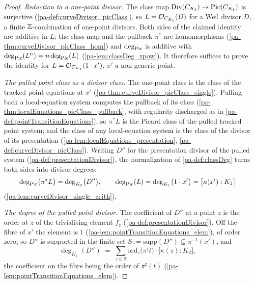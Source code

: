 \begin{proof}
  \leanok
  \emph{Reduction to a one-point divisor.} The class map
  \(\operatorname{Div}(C_{K_1}) \to \operatorname{Pic}(C_{K_1})\) is surjective (\ref{pa-def:curveDivisor_picClass}),
  so \(L = \mathcal{O}_{C_{K_1}}(D)\) for a Weil divisor \(D\), a finite \(\mathbb{Z}\)-combination of
  one-point divisors. Both sides of the claimed identity are additive in \(L\): the
  class map and the pullback \(\pi^{*}\) are homomorphisms
  (\ref{pa-thm:curveDivisor_picClass_hom}) and \(\deg_{\operatorname{Pic}}\) is additive with
  \(\deg_{\operatorname{Pic}}(L^n) = n\deg_{\operatorname{Pic}}(L)\) (\ref{pa-lem:classDeg_zpow}). It therefore
  suffices to prove the identity for \(L = \mathcal{O}_{C_{K_1}}(1 \cdot x')\), \(x'\) a
  non-generic point.

  \emph{The pulled point class as a divisor class.} The one-point class is the class
  of the tracked point equations at \(x'\)
  (\ref{pa-thm:curveDivisor_picClass_single}). Pulling back a local-equation system
  computes the pullback of its class (\ref{pa-thm:localEquations_picClass_pullback},
  with regularity discharged as in \ref{pa-def:pointTransitionEquations}), so
  \(\pi^{*}L\) is the Picard class of the pulled tracked point system; and the class
  of any local-equation system is the class of the divisor of its presentation
  (\ref{pa-lem:localEquations_presentation}, \ref{pa-def:curveDivisor_picClass}). Writing
  \(D''\) for the presentation divisor of the pulled system
  (\ref{pa-def:presentationDivisor}), the normalization of \ref{pa-def:classDeg} turns both
  sides into divisor degrees:
  \[
    \deg_{\operatorname{Pic}}\bigl(\pi^{*}L\bigr) = \deg_{K_2}\bigl(D''\bigr), \qquad
    \deg_{\operatorname{Pic}}(L) = \deg_{K_1}\bigl(1 \cdot x'\bigr) = \bigl[\kappa(x') : K_1\bigr]
  \]
  (\ref{pa-lem:curveDivisor_single_arith}).

  \emph{The degree of the pulled point divisor.} The coefficient of \(D''\) at a point
  \(z\) is the order at \(z\) of the trivialising element \(f_z\)
  (\ref{pa-def:presentationDivisor}). Off the fibre of \(x'\) the element is \(1\)
  (\ref{pa-lem:pointTransitionEquations_elem}), of order zero; so \(D''\) is supported in
  the finite set \(S := \mathrm{supp}(D'') \subseteq \pi^{-1}(x')\), and
  \[
    \deg_{K_2}(D'') \;=\; \sum_{z \in S}
      \mathrm{ord}_z\bigl(\pi^{\sharp}t\bigr) \cdot \bigl[\kappa(z) : K_2\bigr],
  \]
  the coefficient on the fibre being the order of \(\pi^{\sharp}(t)\)
  (\ref{pa-lem:pointTransitionEquations_elem}).


\end{proof}

